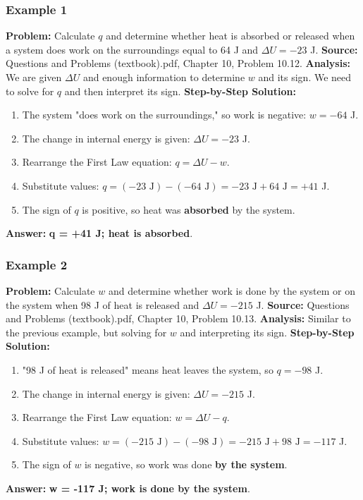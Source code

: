 \documentclass{article}
\begin{document}
\subsubsection{Example 1}
\textbf{Problem:} Calculate $q$ and determine whether heat is absorbed or released when a system does work on the surroundings equal to 64 J and $\Delta U = -23$ J.
\textbf{Source:} Questions and Problems (textbook).pdf, Chapter 10, Problem 10.12.
\textbf{Analysis:} We are given $\Delta U$ and enough information to determine $w$ and its sign. We need to solve for $q$ and then interpret its sign.
\textbf{Step-by-Step Solution:}
\begin{enumerate}
    \item The system "does work on the surroundings," so work is negative: $w = -64$ J.
    \item The change in internal energy is given: $\Delta U = -23$ J.
    \item Rearrange the First Law equation: $q = \Delta U - w$.
    \item Substitute values: $q = (-23 \text{ J}) - (-64 \text{ J}) = -23 \text{ J} + 64 \text{ J} = +41$ J.
    \item The sign of $q$ is positive, so heat was \textbf{absorbed} by the system.
\end{enumerate}
\textbf{Answer:} \textbf{q = +41 J; heat is absorbed}.

\subsubsection{Example 2}
\textbf{Problem:} Calculate $w$ and determine whether work is done by the system or on the system when 98 J of heat is released and $\Delta U = -215$ J.
\textbf{Source:} Questions and Problems (textbook).pdf, Chapter 10, Problem 10.13.
\textbf{Analysis:} Similar to the previous example, but solving for $w$ and interpreting its sign.
\textbf{Step-by-Step Solution:}
\begin{enumerate}
    \item "98 J of heat is released" means heat leaves the system, so $q = -98$ J.
    \item The change in internal energy is given: $\Delta U = -215$ J.
    \item Rearrange the First Law equation: $w = \Delta U - q$.
    \item Substitute values: $w = (-215 \text{ J}) - (-98 \text{ J}) = -215 \text{ J} + 98 \text{ J} = -117$ J.
    \item The sign of $w$ is negative, so work was done \textbf{by the system}.
\end{enumerate}
\textbf{Answer:} \textbf{w = -117 J; work is done by the system}.
\end{document}
